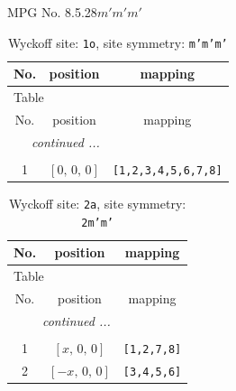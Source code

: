 \documentclass[fleqn,8pt]{jsarticle}
\begin{document}
\setcounter{MaxMatrixCols}{32}

\renewcommand{\tablename}{Table~}
\renewcommand{\figurename}{Figure~}
\begin{center}
\LARGE
MPG No. 8.5.28\quad$m'm'm'$
\end{center}
\renewcommand{\arraystretch}{1.2}
\begin{longtable}{ccc}
\caption{Wyckoff site: {\tt 1o}, site symmetry: {\tt m'm'm'}}
 \\
 \hline \hline
No. & position & mapping \\ \hline \endfirsthead

\multicolumn{2}{l}{\tablename\ \thetable{}} \\
 \hline \hline
No. & position & mapping \\ \hline \endhead

 \hline \hline
\multicolumn{2}{r}{\footnotesize\it continued ...} \\ \endfoot

 \hline \hline
\multicolumn{2}{r}{} \\ \endlastfoot

1 & $\left[ 0,\, 0,\, 0 \right]$ & {\tt [1,2,3,4,5,6,7,8]} \\
\end{longtable}
\renewcommand{\arraystretch}{1.2}
\begin{longtable}{ccc}
\caption{Wyckoff site: {\tt 2a}, site symmetry: {\tt 2m'm'}}
 \\
 \hline \hline
No. & position & mapping \\ \hline \endfirsthead

\multicolumn{2}{l}{\tablename\ \thetable{}} \\
 \hline \hline
No. & position & mapping \\ \hline \endhead

 \hline \hline
\multicolumn{2}{r}{\footnotesize\it continued ...} \\ \endfoot

 \hline \hline
\multicolumn{2}{r}{} \\ \endlastfoot

1 & $\left[ x,\, 0,\, 0 \right]$ & {\tt [1,2,7,8]} \\ \hline
2 & $\left[ - x,\, 0,\, 0 \right]$ & {\tt [3,4,5,6]} \\
\end{longtable}
\renewcommand{\arraystretch}{1.2}
\end{document}
